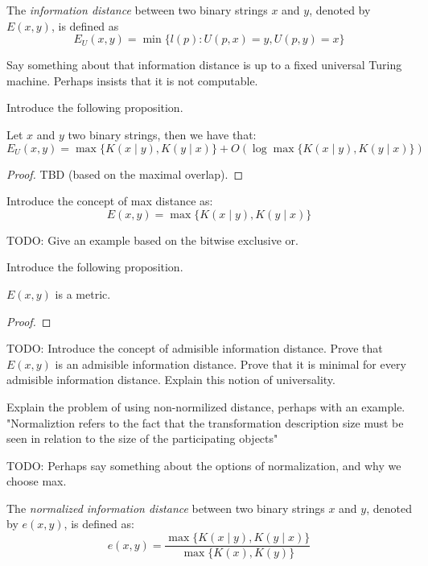 \begin{definition}
The \emph{information distance} between two binary strings $x$ and $y$, denoted by $E(x, y)$, is defined as
\[
E_U(x, y) = \min \{ l(p) : U(p, x) = y, U(p, y) = x \}
\]
\end{definition}

{\color{red} Say something about that information distance is up to a fixed universal Turing machine. Perhaps insists that it is not computable.}

{\color{red} Introduce the following proposition.}

\begin{proposition}
Let $x$ and $y$ two binary strings, then we have that:
\[
E_U(x, y) = \max\{ K(x \mid y), K(y \mid x) \} + O ( \log \max\{ K(x \mid y), K(y \mid x) \}) 
\]
\end{proposition}
\begin{proof}
{\color{red} TBD (based on the maximal overlap).}
\end{proof}

{\color{red} Introduce the concept of max distance as:}
\[
E(x, y) = \max\{ K(x \mid y), K(y \mid x) \}
\]

\begin{example}
{\color{red} TODO: Give an example based on the bitwise exclusive or.}
\end{example}

{\color{red} Introduce the following proposition.}

\begin{proposition}
{\color{red} $E(x, y)$ is a metric.}
\end{proposition}
\begin{proof}
\end{proof}

{\color{red} TODO: Introduce the concept of admisible information distance. Prove that $E(x, y)$ is an admisible information distance. Prove that it is minimal for every admisible information distance. Explain this notion of universality.}

{\color{red} Explain the problem of using non-normilized distance, perhaps with an example. "Normaliztion refers to the fact that the transformation description size must be seen in relation to the size of the participating objects"}

{\color{red} TODO: Perhaps say something about the options of normalization, and why we choose max.}

\begin{definition}
The \emph{normalized information distance} between two binary strings $x$ and $y$, denoted by $e(x, y)$, is defined as:
\[
e(x, y) = \frac{\max\{ K(x \mid y), K(y \mid x) \}}{\max \{ K(x), K(y) \} }
\]
\end{definition}

